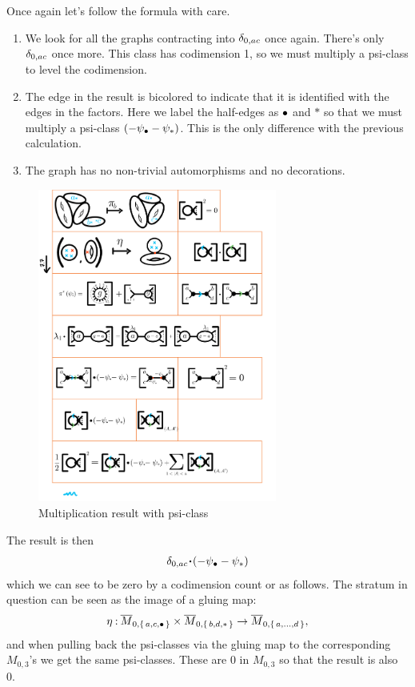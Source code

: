 \documentclass[12pt]{memoir}
\begin{document}
\begin{Ex}
\begin{figure}[h!]
    \end{figure} 
    Once again let's follow the formula with care.
    \begin{enumerate}
        \item We look for all the graphs contracting into $\delta_{0,{ac}}$ once again. There's only $\delta_{0,{ac}}$ once more. This class has codimension 1, so we must multiply a psi-class to level the codimension.
        \item The edge in the result is bicolored to indicate that it is identified with the edges in the factors. Here we label the half-edges as $\bullet$ and $\ast$ so that we must multiply a psi-class $(-\psi_\bullet-\psi_\ast)$. This is the only difference with the previous calculation.
        \item The graph has no non-trivial automorphisms and no decorations.
    \end{enumerate}
    \begin{figure}[h!]
        \centering
        \includegraphics[width=0.7\textwidth, trim= 1.3cm 9.8cm 9cm 15.8cm,clip]{../figs/FigsDNnotability2.pdf}
        \caption{Multiplication result with psi-class}
        \label{fig:divisor-squared-3-M04}
    \end{figure} 
    The result is then 
    $$\dl_{0,{ac}}\.(-\psi_{\8}-\psi_{\ast})$$
    which we can see to be zero by a codimension count or as follows. 
    The stratum in question can be seen as the image of a gluing map:
    $$\eta\mathbin{:}\overline M_{0,\{\,a,c,\bullet\,\}}\times\overline M_{0,\{\,b,d,\ast\,\}}\to\overline M_{0,\{\,a,\dots,d\,\}},$$
    and when pulling back the psi-classes via the gluing map to the corresponding $M_{0,3}$'s we get the same psi-classes. These are $0$ in $M_{0,3}$ so that the result is also 0.
\end{Ex}
\end{document}
